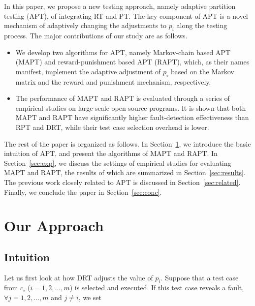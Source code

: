\documentclass[10pt,journal,compsoc]{IEEEtran}
\begin{document}

In this paper, we propose a new testing approach, namely adaptive partition testing (APT), of integrating RT and PT. The key component of APT is a novel mechanism of adaptively changing the adjustments to $p_i$ along the testing process. The major contributions of our study are as follows.

\begin{itemize}
	\item We develop two algorithms for APT, namely Markov-chain based APT (MAPT) and reward-punishment based APT (RAPT), which, as their names manifest, implement the adaptive adjustment of $p_i$ based on the Markov matrix and the reward and punishment mechanism, respectively.
	\item The performance of MAPT and RAPT is evaluated through a series of empirical studies on large-scale open source programs. It is shown that both MAPT and RAPT have significantly higher fault-detection effectiveness than RPT and DRT, while their test case selection overhead is lower.
\end{itemize}

The rest of the paper is organized as follows. In Section~\ref{sec:approach}, we introduce the basic intuition of APT, and present the algorithms of MAPT and RAPT. In Section~\ref{sec:exp}, we discuss the settings of empirical studies for evaluating MAPT and RAPT, the results of which are summarized in Section~\ref{sec:results}. The previous work closely related to APT is discussed in Section~\ref{sec:related}. Finally, we conclude the paper in Section~\ref{sec:conc}.

\section{Our Approach}
\label{sec:approach}

\subsection{Intuition}

Let us first look at how DRT adjusts the value of $p_i$. Suppose that a test case from $c_i$ ($i = 1, 2, \ldots, m$) is selected and executed. If this test case reveals a fault, $\forall j = 1, 2, \ldots, m$ and $j \neq i$, we set
\end{document}
